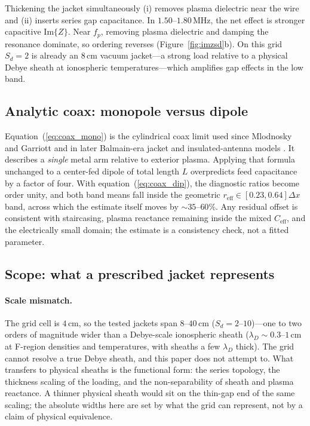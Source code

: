 \documentclass[draft]{agujournal2025}
\begin{document}
Thickening the jacket simultaneously (i) removes plasma dielectric near the wire and (ii) inserts series gap capacitance. In \(1.50\)--\(1.80\,\mathrm{MHz}\), the net effect is stronger capacitive \(\mathrm{Im}\{Z\}\). Near \(f_p\), removing plasma dielectric and damping the resonance dominate, so ordering reverses (Figure~\ref{fig:imzsd}b). On this grid \(S_d=2\) is already an \(8\,\mathrm{cm}\) vacuum jacket---a strong load relative to a physical Debye sheath at ionospheric temperatures---which amplifies gap effects in the low band.

\subsection{Analytic coax: monopole versus dipole}

Equation~(\ref{eq:coax_mono}) is the cylindrical coax limit used since Mlodnosky and Garriott and in later Balmain-era jacket and insulated-antenna models \cite{mlodnosky1962,galejs1966}. It describes a \emph{single} metal arm relative to exterior plasma. Applying that formula unchanged to a center-fed dipole of total length \(L\) overpredicts feed capacitance by a factor of four. With equation~(\ref{eq:coax_dip}), the diagnostic ratios become order unity, and both band means fall inside the geometric \(r_\mathrm{eff}\in[0.23,0.64]\Delta x\) band, across which the estimate itself moves by \(\sim 35\)--\(60\%\). Any residual offset is consistent with staircasing, plasma reactance remaining inside the mixed \(C_\mathrm{eff}\), and the electrically small domain; the estimate is a consistency check, not a fitted parameter.

\subsection{Scope: what a prescribed jacket represents}

\paragraph{Scale mismatch.} The grid cell is \(4\,\mathrm{cm}\), so the tested jackets span \(8\)--\(40\,\mathrm{cm}\) (\(S_d=2\)--\(10\))---one to two orders of magnitude wider than a Debye-scale ionospheric sheath (\(\lambda_D\sim 0.3\)--\(1\,\mathrm{cm}\) at F-region densities and temperatures, with sheaths a few \(\lambda_D\) thick). The grid cannot resolve a true Debye sheath, and this paper does not attempt to. What transfers to physical sheaths is the functional form: the series topology, the thickness scaling of the loading, and the non-separability of sheath and plasma reactance. A thinner physical sheath would sit on the thin-gap end of the same scaling; the absolute widths here are set by what the grid can represent, not by a claim of physical equivalence.
\end{document}
